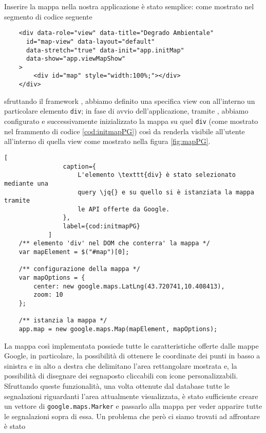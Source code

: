             Inserire la mappa nella nostra applicazione \pg{} è stato semplice:
            come mostrato nel segmento di codice seguente
            \begin{lstlisting}
    <div data-role="view" data-title="Degrado Ambientale"
      id="map-view" data-layout="default"
      data-stretch="true" data-init="app.initMap"
      data-show="app.viewMapShow"
    >
        <div id="map" style="width:100%;"></div>
    </div>
            \end{lstlisting}
            sfruttando il framework \kendomob{}, abbiamo definito una specifica
            view con all'interno un particolare elemento \texttt{div}; in fase di
            avvio dell'applicazione, tramite \js{}, abbiamo configurato e
            successivamente inizializzato la mappa su quel \texttt{div} (come
            mostrato nel frammento di codice \ref{cod:initmapPG}) così
            da renderla visibile all'utente all'interno di quella view come
            mostrato nella figura \ref{fig:mapPG}.
            \begin{lstlisting}[
                caption={
                    L'elemento \texttt{div} è stato selezionato mediante una
                    query \jq{} e su quello si è istanziata la mappa tramite
                    le API offerte da Google.
                },
                label={cod:initmapPG}
            ]
    /** elemento 'div' nel DOM che conterra' la mappa */
    var mapElement = $("#map")[0];

    /** configurazione della mappa */
    var mapOptions = {
        center: new google.maps.LatLng(43.720741,10.408413),
        zoom: 10
    };

    /** istanzia la mappa */
    app.map = new google.maps.Map(mapElement, mapOptions);
            \end{lstlisting}
            La mappa così implementata possiede tutte le caratteristiche offerte
            dalle mappe Google, in particolare, la possibilità di ottenere le
            coordinate dei punti in basso a sinistra e in alto a destra che
            delimitano l'area rettangolare mostrata e, la possibilità di
            disegnare dei segnaposto cliccabili con icone personalizzabili.
            Sfruttando queste funzionalità, una volta ottenute dal database
            tutte le segnalazioni riguardanti l'area attualmente visualizzata, è
            stato sufficiente creare un vettore di \texttt{google.maps.Marker} e
            passarlo alla mappa per veder apparire tutte le segnalazioni sopra
            di essa. Un problema che però ci siamo trovati ad affrontare è stato
